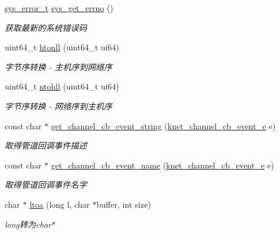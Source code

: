\begin{DoxyCompactItemize}
\hyperlink{a00066_aeaea39e7ef5adeec1efaee3eee6b12ff_aeaea39e7ef5adeec1efaee3eee6b12ff}{sys\+\_\+error\+\_\+t} \hyperlink{a00100_a2e3ede072c59452900afcb1334611dac_a2e3ede072c59452900afcb1334611dac}{sys\+\_\+get\+\_\+errno} ()
\begin{DoxyCompactList}\small\item\em 获取最新的系统错误码 \end{DoxyCompactList}\item 
uint64\+\_\+t \hyperlink{a00100_ab1f59aa518d342661072356abbbb5e85_ab1f59aa518d342661072356abbbb5e85}{htonll} (uint64\+\_\+t ui64)
\begin{DoxyCompactList}\small\item\em 字节序转换 -\/ 主机序到网络序 \end{DoxyCompactList}\item 
uint64\+\_\+t \hyperlink{a00100_aebdeac120dd80e9450e54e6f18151f45_aebdeac120dd80e9450e54e6f18151f45}{ntohll} (uint64\+\_\+t ui64)
\begin{DoxyCompactList}\small\item\em 字节序转换 -\/ 网络序到主机序 \end{DoxyCompactList}\item 
const char $\ast$ \hyperlink{a00100_aaa5f51532b5e8589a2af4a949dfcb46b_aaa5f51532b5e8589a2af4a949dfcb46b}{get\+\_\+channel\+\_\+cb\+\_\+event\+\_\+string} (\hyperlink{a00066_a2fd2faf971268f5b682ab375c455f7c9_a2fd2faf971268f5b682ab375c455f7c9}{knet\+\_\+channel\+\_\+cb\+\_\+event\+\_\+e} e)
\begin{DoxyCompactList}\small\item\em 取得管道回调事件描述 \end{DoxyCompactList}\item 
const char $\ast$ \hyperlink{a00100_a3c666a6bdd27f2bdb2202ffd4fb8899e_a3c666a6bdd27f2bdb2202ffd4fb8899e}{get\+\_\+channel\+\_\+cb\+\_\+event\+\_\+name} (\hyperlink{a00066_a2fd2faf971268f5b682ab375c455f7c9_a2fd2faf971268f5b682ab375c455f7c9}{knet\+\_\+channel\+\_\+cb\+\_\+event\+\_\+e} e)
\begin{DoxyCompactList}\small\item\em 取得管道回调事件名字 \end{DoxyCompactList}\item 
char $\ast$ \hyperlink{a00100_aaf5ac9c0270bd67e64f697d7fcf5e9ea_aaf5ac9c0270bd67e64f697d7fcf5e9ea}{ltoa} (long l, char $\ast$buffer, int size)
\begin{DoxyCompactList}\small\item\em long转为char$\ast$ \end{DoxyCompactList}\item 

\end{DoxyCompactItemize}
